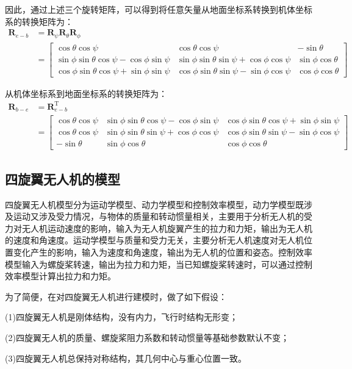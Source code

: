 \documentclass[lang=chs, degree=master, blindreview=false, winfonts=true]{yanputhesis}
\begin{document}
因此，通过上述三个旋转矩阵，可以得到将任意矢量从地面坐标系转换到机体坐标系的转换矩阵为：
$$\begin{aligned}\boldsymbol{R}_{e-b}&=\boldsymbol{R}_{\psi}\boldsymbol{R}_{\theta}\boldsymbol{R}_{\phi}\\&=\begin{bmatrix}\cos\theta\cos\psi&\cos\theta\cos\psi&-\sin\theta\\\sin\phi\sin\theta\cos\psi-\cos\phi\sin\psi&\sin\phi\sin\theta\sin\psi+\cos\phi\cos\psi&\sin\phi\cos\theta\\\cos\phi\sin\theta\cos\psi+\sin\phi\sin\psi&\cos\phi\sin\theta\sin\psi-\sin\phi\cos\psi&\cos\phi\cos\theta\end{bmatrix}\end{aligned}$$

从机体坐标系到地面坐标系的转换矩阵为：
$$\begin{aligned}\boldsymbol{R}_{b-e}&=\bm{R}_{e-b}^\mathrm{T}\\&=\begin{bmatrix}\cos\theta\cos\psi&\sin\phi\sin\theta\cos\psi-\cos\phi\sin\psi&\cos\phi\sin\theta\cos\psi+\sin\phi\sin\psi\\\cos\theta\cos\psi&\sin\phi\sin\theta\sin\psi+\cos\phi\cos\psi&\cos\phi\sin\theta\sin\psi-\sin\phi\cos\psi\\-\sin\theta&\sin\phi\cos\theta&\cos\phi\cos\theta\end{bmatrix}\end{aligned}$$

\subsection{四旋翼无人机的模型}
四旋翼无人机模型分为运动学模型、动力学模型和控制效率模型，动力学模型既涉及运动又涉及受力情况，与物体的质量和转动惯量相关，主要用于分析无人机的受力对无人机运动速度的影响，输入为无人机旋翼产生的拉力和力矩，输出为无人机的速度和角速度。运动学模型与质量和受力无关，主要分析无人机速度对无人机位置变化产生的影响，输入为速度和角速度，输出为无人机的位置和姿态。控制效率模型输入为螺旋桨转速，输出为拉力和力矩，当已知螺旋桨转速时，可以通过控制效率模型计算出拉力和力矩。

为了简便，在对四旋翼无人机进行建模时，做了如下假设：

(1)四旋翼无人机是刚体结构，没有内力，飞行时结构无形变；

(2)四旋翼无人机的质量、螺旋桨阻力系数和转动惯量等基础参数默认不变；

(3)四旋翼无人机总保持对称结构，其几何中心与重心位置一致。
\end{document}
